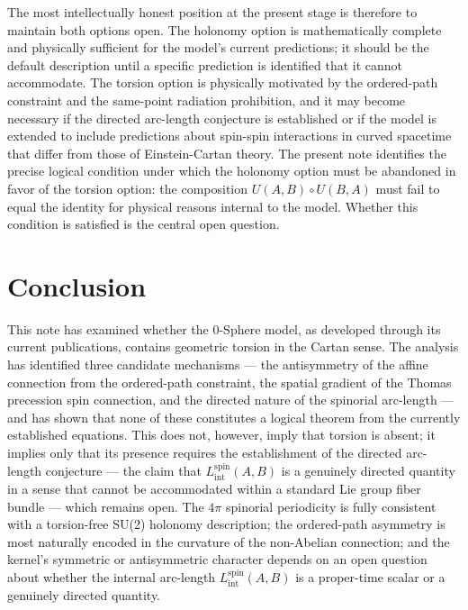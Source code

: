 \documentclass[%
 reprint,
 amsmath,amssymb,
 aps,
 prb,
]{revtex4-2}
\numberwithin{equation}{section}
\newcommand{\Lspin}{L_{\text{int}}^{\text{spin}}}
\begin{document}
The most intellectually honest position at the present stage is therefore to maintain both options open. The holonomy option is mathematically complete and physically sufficient for the model's current predictions; it should be the default description until a specific prediction is identified that it cannot accommodate. The torsion option is physically motivated by the ordered-path constraint and the same-point radiation prohibition, and it may become necessary if the directed arc-length conjecture is established or if the model is extended to include predictions about spin-spin interactions in curved spacetime that differ from those of Einstein-Cartan theory. The present note identifies the precise logical condition under which the holonomy option must be abandoned in favor of the torsion option: the composition $U(A,B)\circ U(B,A)$ must fail to equal the identity for physical reasons internal to the model. Whether this condition is satisfied is the central open question.

\section{Conclusion}
\label{sec:conclusion}

This note has examined whether the 0-Sphere model, as developed through its current publications, contains geometric torsion in the Cartan sense. The analysis has identified three candidate mechanisms --- the antisymmetry of the affine connection from the ordered-path constraint, the spatial gradient of the Thomas precession spin connection, and the directed nature of the spinorial arc-length --- and has shown that none of these constitutes a logical theorem from the currently established equations. This does not, however, imply that torsion is absent; it implies only that its presence requires the establishment of the directed arc-length conjecture --- the claim that $\Lspin(A,B)$ is a genuinely directed quantity in a sense that cannot be accommodated within a standard Lie group fiber bundle --- which remains open. The $4\pi$ spinorial periodicity is fully consistent with a torsion-free SU(2) holonomy description; the ordered-path asymmetry is most naturally encoded in the curvature of the non-Abelian connection; and the kernel's symmetric or antisymmetric character depends on an open question about whether the internal arc-length $\Lspin(A,B)$ is a proper-time scalar or a genuinely directed quantity.
\end{document}
